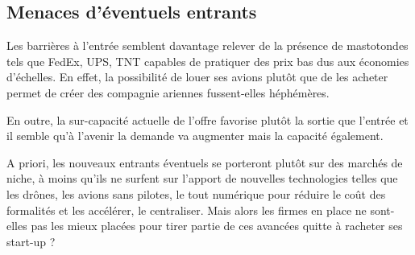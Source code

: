 \subsection{Menaces d'éventuels entrants}


Les barrières à l'entrée semblent davantage relever de la présence de mastotondes tels que FedEx, UPS, TNT capables de pratiquer des prix bas dus aux économies d'échelles. En effet, la possibilité de louer ses avions plutôt que de les acheter
permet de créer des compagnie ariennes fussent-elles héphémères.

En outre, la sur-capacité actuelle de l'offre favorise plutôt la sortie que l'entrée et il semble qu'à l'avenir la demande va augmenter mais la capacité 
également.  

A priori, les nouveaux entrants éventuels se porteront plutôt sur des marchés de niche, à moins qu'ils ne surfent sur l'apport de nouvelles technologies telles que les drônes, les avions sans pilotes, le tout numérique pour réduire le coût des formalités et les accélérer, le centraliser. Mais alors les firmes en place ne sont-elles pas les mieux placées pour tirer partie de ces avancées quitte à racheter ses start-up ?


